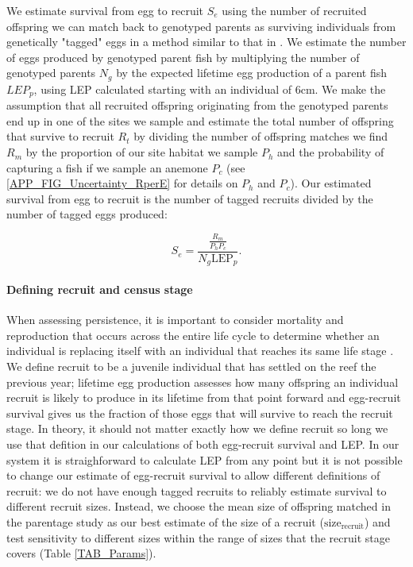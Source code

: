 \documentclass[12pt, oneside]{article}   	%
\begin{document}
We estimate survival from egg to recruit $S_e$ using the number of recruited offspring we can match back to genotyped parents as surviving individuals from genetically "tagged" eggs in a method similar to that in \cite{johnson2018integrating}. We estimate the number of eggs produced by genotyped parent fish by multiplying the number of genotyped parents $N_g$ by the expected lifetime egg production of a parent fish $LEP_p$, using LEP calculated starting with an individual of 6cm. We make the assumption that all recruited offspring originating from the genotyped parents end up in one of the sites we sample and estimate the total number of offspring that survive to recruit $R_t$ by dividing the number of offspring matches we find $R_m$ by the proportion of our site habitat we sample $P_h$ and the probability of capturing a fish if we sample an anemone $P_c$ (see \ref{APP_FIG_Uncertainty_RperE} for details on $P_h$ and $P_c$). Our estimated survival from egg to recruit is the number of tagged recruits divided by the number of tagged eggs produced:

\begin{equation}
S_e = \frac{\frac{R_m}{P_h P_c}}{N_g \text{LEP}_p}. \label{EQN_EggRecruitSurv}
\end{equation}

\paragraph*{Defining recruit and census stage} %

When assessing persistence, it is important to consider mortality and reproduction that occurs across the entire life cycle to determine whether an individual is replacing itself with an individual that reaches its same life stage \citep{burgess2014beyond}. We define recruit to be a juvenile individual that has settled on the reef the previous year; lifetime egg production assesses how many offspring an individual recruit is likely to produce in its lifetime from that point forward and egg-recruit survival gives us the fraction of those eggs that will survive to reach the recruit stage. In theory, it should not matter exactly how we define recruit so long we use that defition in our calculations of both egg-recruit survival and LEP. In our system it is straighforward to calculate LEP from any point but it is not possible to change our estimate of egg-recruit survival to allow different definitions of recruit: we do not have enough tagged recruits to reliably estimate survival to different recruit sizes. Instead, we choose the mean size of offspring matched in the parentage study as our best estimate of the size of a recruit ($\text{size}_\text{recruit}$) and test sensitivity to different sizes within the range of sizes that the recruit stage covers (Table \ref{TAB_Params}).
\end{document}
